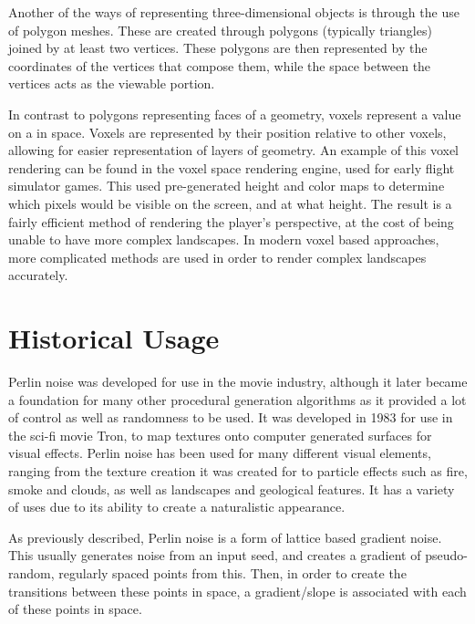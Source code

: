 \documentclass[10pt]{report}
\begin{document}
		Another of the ways of representing three-dimensional objects is through the use of polygon meshes. These are created through polygons (typically triangles) joined by at least two vertices. These polygons are then represented by the coordinates of the vertices that compose them, while the space between the vertices acts as the viewable portion.
		
		In contrast to polygons representing faces of a geometry, voxels represent a value on a in space. Voxels are represented by their position relative to other voxels, allowing for easier representation of layers of geometry. An example of this voxel rendering can be found in the voxel space rendering engine, used for early flight simulator games. This used pre-generated height and color maps to determine which pixels would be visible on the screen, and at what height. The result is a fairly efficient method of rendering the player's perspective, at the cost of being unable to have more complex landscapes. In modern voxel based approaches, more complicated methods are used in order to render complex landscapes accurately.
		
	\vspace{10pt}
	\let\clearpage\relax
	\chapter{Historical Usage} %
		
		Perlin noise was developed for use in the movie industry, although it later became a foundation for many other procedural generation algorithms as it provided a lot of control as well as randomness to be used. It was developed in 1983 for use in the sci-fi movie Tron, to map textures onto computer generated surfaces for visual effects. Perlin noise has been used for many different visual elements, ranging from the texture creation it was created for to particle effects such as fire, smoke and clouds, as well as landscapes and geological features. It has a variety of uses due to its ability to create a naturalistic appearance.
		
		As previously described, Perlin noise is a form of lattice based gradient noise. This usually generates noise from an input seed, and creates a gradient of pseudo-random, regularly spaced points from this. Then, in order to create the transitions between these points in space, a gradient/slope is associated with each of these points in space.
		
\end{document}
